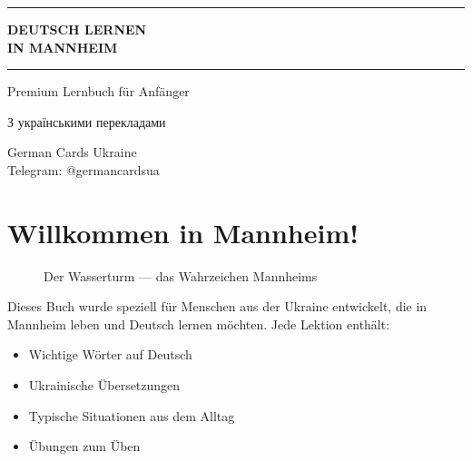 \documentclass[12pt,twoside,openright]{memoir}
\begin{document}
\begin{titlingpage}
  \begin{center}
    \vspace*{2cm}


    \vspace{1cm}
    {\color{gold}\rule{\linewidth}{3pt}}
    \vspace{0.5cm}

    {\fontsize{36}{42}\selectfont\sffamily\bfseries\color{darkbg}
    DEUTSCH LERNEN\\IN MANNHEIM}

    \vspace{0.5cm}
    {\color{gold}\rule{\linewidth}{3pt}}
    \vspace{1cm}

    {\Large\sffamily Premium Lernbuch für Anfänger}

    \vspace{0.3cm}
    {\large\sffamily\color{lightgold}З українськими перекладами}

    \vfill

    {\sffamily\large German Cards Ukraine}\\
    {\sffamily\small\color{lightgold}Telegram: @germancardsua}

    \vspace{1cm}
  \end{center}
\end{titlingpage}

\tableofcontents
\newpage

\chapter{Willkommen in Mannheim!}

\begin{figure}[h]
  \centering
  \fbox{\rule{0pt}{4cm}\rule{8cm}{0pt}} %
  \caption{Der Wasserturm — das Wahrzeichen Mannheims}
\end{figure}

\begin{lernkasten}
Dieses Buch wurde speziell für Menschen aus der Ukraine entwickelt, die in Mannheim leben und Deutsch lernen möchten. Jede Lektion enthält:
\begin{itemize}[nosep]
  \item Wichtige Wörter auf Deutsch
  \item Ukrainische Übersetzungen
  \item Typische Situationen aus dem Alltag
  \item Übungen zum Üben
\end{itemize}
\end{lernkasten}
\end{document}
